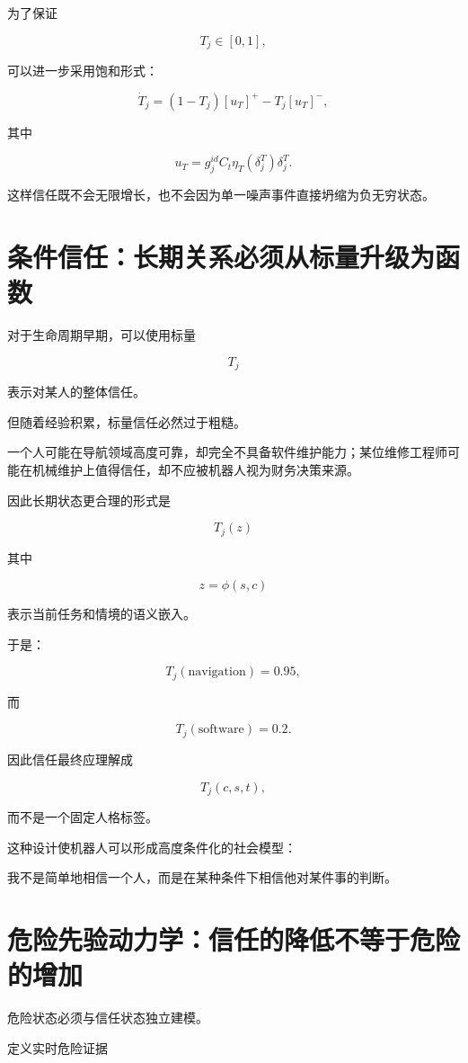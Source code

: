 为了保证

\[
T_j\in[0,1],
\]

可以进一步采用饱和形式：

\[
\boxed{
\dot T_j
=
(1-T_j)
[u_T]^+
-
T_j
[u_T]^-,
}
\]

其中

\[
u_T
=
g_j^{id}
C_t
\eta_T(\delta_j^T)
\delta_j^T.
\]

这样信任既不会无限增长，也不会因为单一噪声事件直接坍缩为负无穷状态。


\section{条件信任：长期关系必须从标量升级为函数}

对于生命周期早期，可以使用标量

\[
T_j
\]

表示对某人的整体信任。

但随着经验积累，标量信任必然过于粗糙。

一个人可能在导航领域高度可靠，却完全不具备软件维护能力；某位维修工程师可能在机械维护上值得信任，却不应被机器人视为财务决策来源。

因此长期状态更合理的形式是

\[
\boxed{
T_j(z)
}
\]

其中

\[
z=\phi(s,c)
\]

表示当前任务和情境的语义嵌入。

于是：

\[
T_j(\mathrm{navigation})=0.95,
\]

而

\[
T_j(\mathrm{software})=0.2.
\]

因此信任最终应理解成

\[
T_j(c,s,t),
\]

而不是一个固定人格标签。

这种设计使机器人可以形成高度条件化的社会模型：

\begin{statementbox}
我不是简单地相信一个人，而是在某种条件下相信他对某件事的判断。
\end{statementbox}


\section{危险先验动力学：信任的降低不等于危险的增加}

危险状态必须与信任状态独立建模。

定义实时危险证据

